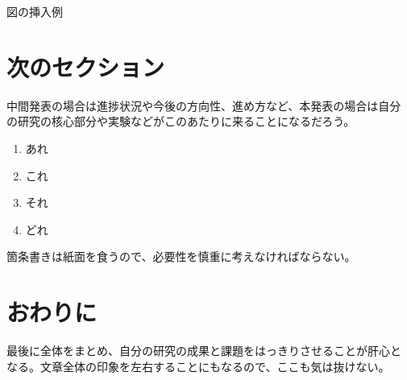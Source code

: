 \documentclass[dvipdfmx,uplatex,11pt]{jabstract}
\begin{document}
\begin{multicols}{2}
\begin{figurehere}
  \centering
  \caption{図の挿入例}
  \label{fig:sample}
\end{figurehere}

\section{次のセクション}
中間発表の場合は進捗状況や今後の方向性、進め方など、本発表の場合は自分
の研究の核心部分や実験などがこのあたりに来ることになるだろう。

\begin{enumerate}
\item あれ
\item これ
\item それ
\item どれ
\end{enumerate}

箇条書きは紙面を食うので、必要性を慎重に考えなければならない。

\section*{おわりに}
最後に全体をまとめ、自分の研究の成果と課題をはっきりさせることが肝心と
なる。文章全体の印象を左右することにもなるので、ここも気は抜けない。

%

{\small
\begin{thebibliography}{99}
\end{thebibliography}
}

\end{multicols}
\end{document}
